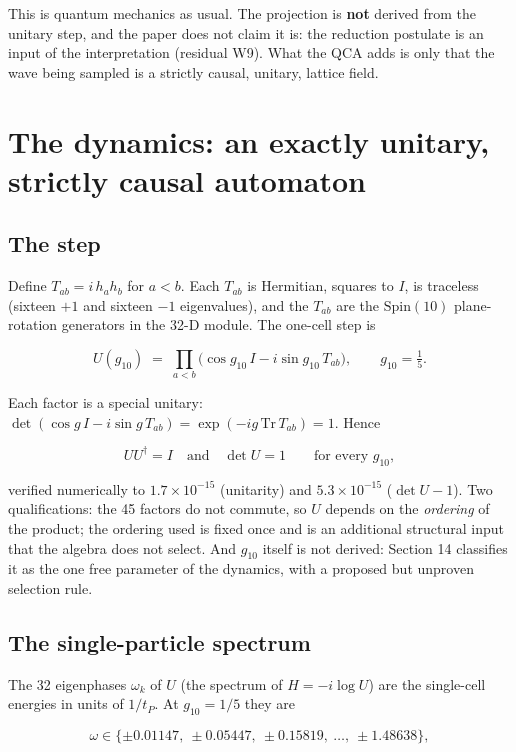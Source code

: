 \documentclass[aps,prd,amsmath,amssymb,superscriptaddress,longbibliography,floatfix,preprint]{revtex4-2}
\begin{document}
This is quantum mechanics as usual. The projection is \textbf{not} derived from the unitary step, and the paper does not claim it is: the reduction postulate is an input of the interpretation (residual W9). What the QCA adds is only that the wave being sampled is a strictly causal, unitary, lattice field.

\section{The dynamics: an exactly unitary, strictly causal automaton}

\subsection{The step}

Define $T_{ab} = i\,\allowbreak{}h_a h_b$ for $a<b$. Each $T_{ab}$ is Hermitian, squares to $I$, is traceless (sixteen $+1$ and sixteen $-1$ eigenvalues), and the $T_{ab}$ are the $\mathrm{Spin}(10)$ plane-rotation generators in the 32-D module. The one-cell step is

\[U(g_{10}) \;=\; \prod_{a<b}\Big(\cos g_{10}\, I - i \sin g_{10}\, T_{ab}\Big),\qquad g_{10} = \tfrac15 .\]

Each factor is a special unitary: $\det(\cos g\,\allowbreak{} I - i\sin g\,\allowbreak{} T_{ab}) = \exp(-i g\,\allowbreak{}\mathrm{Tr}\,\allowbreak{}T_{ab}) = 1$. Hence

\[U U^\dagger = I \quad\text{and}\quad \det U = 1 \qquad\text{for every } g_{10},\]

verified numerically to $1.7\times10^{-15}$ (unitarity) and $5.3\times10^{-15}$ ($\det U - 1$). Two qualifications: the 45 factors do not commute, so $U$ depends on the \emph{ordering} of the product; the ordering used is fixed once and is an additional structural input that the algebra does not select. And $g_{10}$ itself is not derived: Section 14 classifies it as the one free parameter of the dynamics, with a proposed but unproven selection rule.

\subsection{The single-particle spectrum}

The 32 eigenphases $\omega_k$ of $U$ (the spectrum of $H = -i\log U$) are the single-cell energies in units of $1/t_P$. At $g_{10} = 1/5$ they are

\[\omega \in \{\pm 0.01147,\ \pm 0.05447,\ \pm 0.15819,\ \dots,\ \pm 1.48638\},\]
\end{document}
